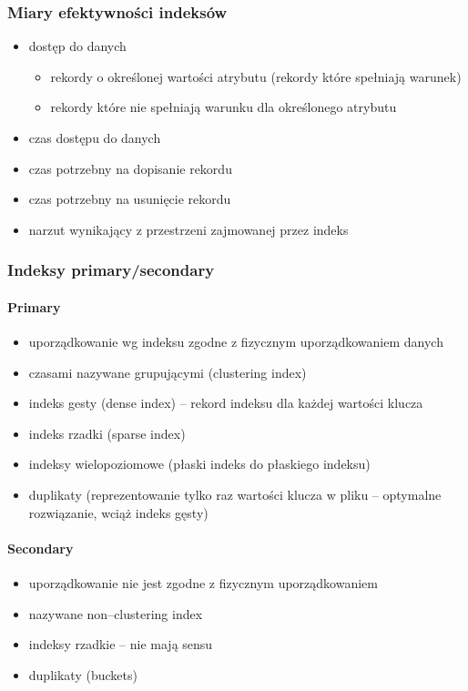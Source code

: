 \documentclass[12pt]{article}
\begin{document}
\subsubsection{Miary efektywności indeksów}

\begin{itemize}
\item dostęp do danych
\begin{itemize}
\item rekordy o określonej wartości atrybutu (rekordy które spełniają warunek)
\item rekordy które nie spełniają warunku dla określonego atrybutu
\end{itemize}
\item czas dostępu do danych
\item czas potrzebny na dopisanie rekordu
\item czas potrzebny na usunięcie rekordu
\item narzut wynikający z przestrzeni zajmowanej przez indeks
\end{itemize}

\subsubsection{Indeksy primary/secondary}

\paragraph{Primary}
\begin{itemize}
\item uporządkowanie wg indeksu zgodne z fizycznym uporządkowaniem danych
\item czasami nazywane grupującymi (clustering index)
\item indeks gesty (dense index) -- rekord indeksu dla każdej wartości klucza
\item indeks rzadki (sparse index)
\item indeksy wielopoziomowe (płaski indeks do płaskiego indeksu)
\item duplikaty (reprezentowanie tylko raz wartości klucza w pliku -- optymalne rozwiązanie, wciąż indeks gęsty)
\end{itemize}
\paragraph{Secondary}
\begin{itemize}
\item uporządkowanie nie jest zgodne z fizycznym uporządkowaniem
\item nazywane non--clustering index
\item indeksy rzadkie -- nie mają sensu
\item duplikaty (buckets)
\end{itemize}
\end{document}
